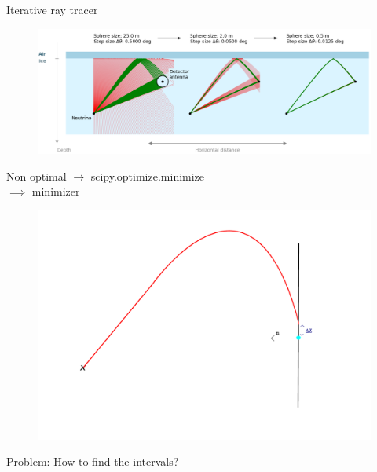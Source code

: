 \documentclass{beamer}
\begin{document}
\begin{frame}{Iterative ray tracer}
	\begin{figure}
		\includegraphics[width=\textwidth]{figures/iterative_explanation.png}
	\end{figure}
\end{frame}
\begin{frame}
	\centering
	Non optimal $\rightarrow$ scipy.optimize.minimize\\\vspace{1cm}
	$\implies$ minimizer
\end{frame}
\begin{frame}
	\begin{figure}
		\includegraphics[width=\textwidth]{figures/PrincipleIllu.pdf}
	\end{figure}
\end{frame}
\begin{frame}
	\centering
	Problem: How to find the intervals?
\end{frame}
\end{document}
